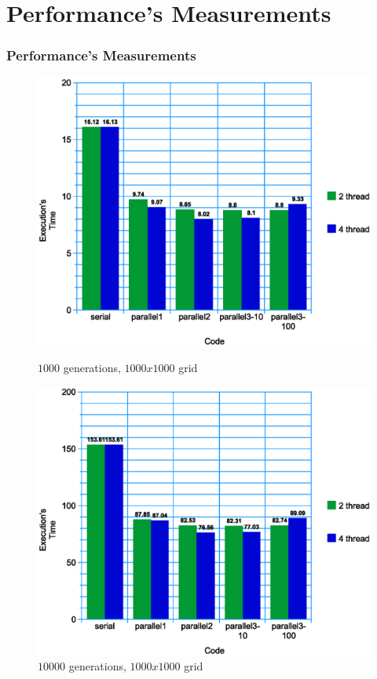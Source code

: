 \documentclass{beamer}
\begin{document}
\section{Performance's Measurements}
\begin{frame}
	\frametitle{Performance's Measurements}
	\begin{figure}
		\centering
		\begin{minipage}{0.5\textwidth}
			\centering
			\includegraphics[width=\linewidth]{../report/graph.eps}
			\caption{$1000$ generations, $1000x1000$ grid}
		\end{minipage}%
		\begin{minipage}{0.5\textwidth}
			\centering
			\includegraphics[width=\linewidth]{../report/1000-10000.eps}
			\caption{$10000$ generations, $1000x1000$ grid}
		\end{minipage}
	\end{figure}
\end{frame}
\end{document}
